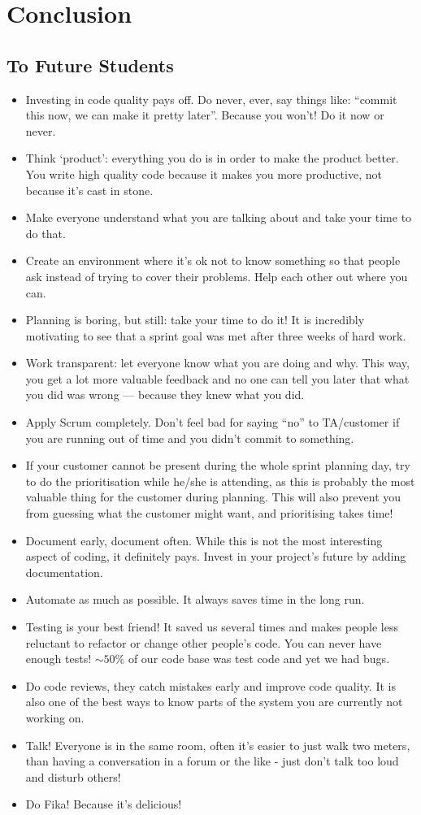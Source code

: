 \documentclass[11pt,a4paper]{report}
\begin{document}
\chapter{Conclusion}
\section*{To Future Students}
\begin{itemize}
\item  Investing in code quality pays off. Do never, ever, say things like:
``commit this now, we can make it pretty later''. Because you won't!
Do it now or never.
\item Think `product': everything you do is in order to make the product better.
You write high quality code because it makes you more productive, not because
it's cast in stone.
\item Make everyone understand what you are talking about and take your time to
do that.
\item Create an environment where it's ok not to know something so that people
ask instead of trying to cover their problems. Help each other out where you
can.
\item Planning is boring, but still: take your time to do it! It is incredibly
motivating to see that a sprint goal was met after three weeks of hard work.
\item Work transparent: let everyone know what you are doing and why. This way,
you get a lot more valuable feedback and no one can tell you later that what you
did was wrong --- because they knew what you did.
\item Apply Scrum completely. Don't feel bad for saying ``no'' to TA/customer if
you are running out of time and you didn't commit to something.
\item If your customer cannot be present during the whole sprint planning day,
try to do the prioritisation while he/she is attending, as this is probably the
most valuable thing for the customer during planning. This will also prevent you
from guessing what the customer might want, and prioritising takes time!
\item Document early, document often. While this is not the most interesting aspect
of coding, it definitely pays. Invest in your project's future by adding documentation.
\item Automate as much as possible. It always saves time in the long run.
\item Testing is your best friend!
      It saved us several times and makes people less reluctant to refactor
      or change other people's code.
      You can never have enough tests!
      $\sim 50\%$ of our code base was test code and yet we had bugs.
\item Do code reviews, they catch mistakes early and improve code quality.
      It is also one of the best ways to know parts of the system you are
      currently not working on.
\item Talk! Everyone is in the same room, often it's easier to just walk two
      meters, than having a conversation in a forum or the like -
      just don't talk too loud and disturb others!
\item Do Fika! Because it's delicious!
\end{itemize}
\end{document}
